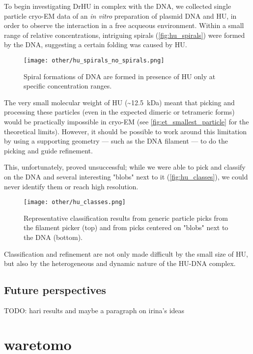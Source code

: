 To begin investigating DrHU in complex with the DNA, we collected single particle cryo-EM data of an \textit{in vitro} preparation of plasmid DNA and HU, in order to observe the interaction in a free acqueous environment.
Within a small range of relative concentrations, intriguing spirals (\autoref{fig:hu_spirals}) were formed by the DNA, suggesting a certain folding was caused by HU.

\begin{figure}[ht]
    \centering
    \texttt{[image: other/hu\_spirals\_no\_spirals.png]}
    \caption[HU-induced DNA spirals]{Spiral formations of DNA are formed in presence of HU only at specific concentration ranges.}
    \label{fig:hu_spirals}
\end{figure}

The very small molecular weight of HU (\sim\qty{12.5}{\kilo\dalton}) meant that picking and processing these particles (even in the expected dimeric or tetrameric forms) would be practically impossible in cryo-EM (see \autoref{fig:et_smallest_particle} for the theoretical limits).
However, it should be possible to work around this limitation by using a supporting geometry --- such as the DNA filament --- to do the picking and guide refinement.

This, unfortunately, proved unsuccessful; while we were able to pick and classify on the DNA and several interesting "blobs" next to it (\autoref{fig:hu_classes}), we could never identify them or reach high resolution.

\begin{figure}[ht]
    \centering
    \texttt{[image: other/hu\_classes.png]}
    \caption[HU+DNA: 2D classes]{Representative classification results from generic particle picks from the filament picker (top) and from picks centered on "blobs" next to the DNA (bottom).}
    \label{fig:hu_classes}
\end{figure}

Classification and refinement are not only made difficult by the small size of HU, but also by the heterogeneous and dynamic nature of the HU-DNA complex.

\subsection{Future perspectives}

TODO: hari results and maybe a paragraph on irina's ideas

\section{waretomo}

